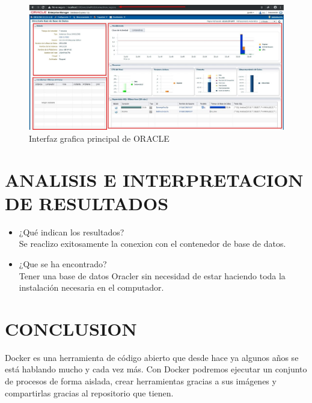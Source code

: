 \documentclass[preprint,12pt]{elsarticle}
\begin{document}
\begin{figure}[H]
	\begin{center}
		\includegraphics[width=12cm]{./IMAGENES/foto15} 
		\caption{Interfaz grafica principal de ORACLE}
	\end{center}
\end{figure}


\section{ANALISIS E INTERPRETACION DE RESULTADOS }
\begin{itemize}
	\item ¿Qué indican los resultados? \\
	Se reaclizo exitosamente la conexion con el contenedor de base de datos.
	\item ¿Que se ha encontrado?\\
	Tener una base de datos Oracler sin necesidad de estar haciendo toda la instalación necesaria en el computador.
\end{itemize}


\section{CONCLUSION}
Docker es una herramienta de código abierto que desde hace ya algunos años se está hablando mucho y cada vez más. Con Docker podremos ejecutar un conjunto de procesos de forma aislada, crear herramientas gracias a sus imágenes y compartirlas gracias al repositorio que tienen.
\end{document}
